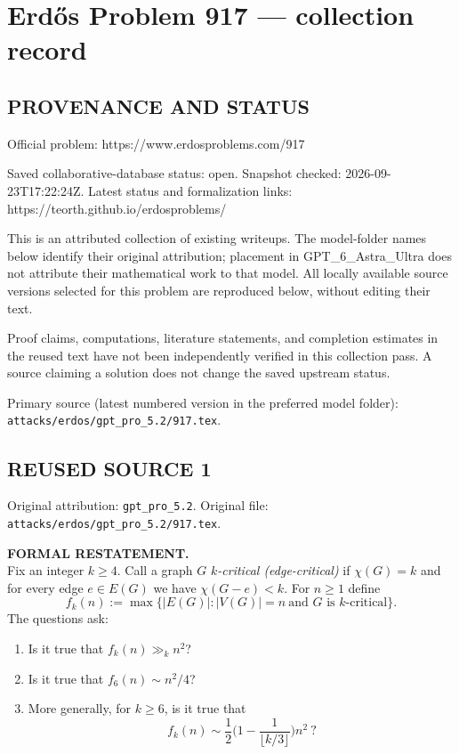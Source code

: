 \section*{Erd\H{o}s Problem 917 --- collection record}

\subsection*{PROVENANCE AND STATUS}
Official problem: https://www.erdosproblems.com/917

Saved collaborative-database status: open.
Snapshot checked: 2026-09-23T17:22:24Z.
Latest status and formalization links: https://teorth.github.io/erdosproblems/

This is an attributed collection of existing writeups. The model-folder names below identify their original attribution; placement in GPT\_6\_Astra\_Ultra does not attribute their mathematical work to that model. All locally available source versions selected for this problem are reproduced below, without editing their text.

Proof claims, computations, literature statements, and completion estimates in the reused text have not been independently verified in this collection pass. A source claiming a solution does not change the saved upstream status.

Primary source (latest numbered version in the preferred model folder): \texttt{attacks/erdos/gpt\_pro\_5.2/917.tex}.

\subsection*{REUSED SOURCE 1}
Original attribution: \texttt{gpt\_pro\_5.2}.
Original file: \texttt{attacks/erdos/gpt\_pro\_5.2/917.tex}.


\noindent\textbf{FORMAL RESTATEMENT.}\\
Fix an integer $k\ge 4$. Call a graph $G$ \emph{$k$-critical (edge-critical)} if $\chi(G)=k$ and for every edge $e\in E(G)$ we have $\chi(G-e)<k$. For $n\ge 1$ define
\[
 f_k(n):=\max\{|E(G)|: |V(G)|=n\ \text{and $G$ is $k$-critical}\}.
\]
The questions ask:
\begin{enumerate}
\item[(Q1)] Is it true that $f_k(n)\gg_k n^2$?
\item[(Q2)] Is it true that $f_6(n)\sim n^2/4$?
\item[(Q3)] More generally, for $k\ge 6$, is it true that
\[ f_k(n) \sim \frac12\Big(1-\frac{1}{\lfloor k/3\rfloor}\Big)n^2\ ?\]
\end{enumerate}

